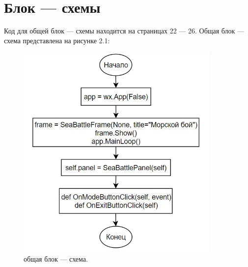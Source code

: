 \section{\label{sec:ch02/sec08}Блок --- схемы}
Код для общей блок --- схемы находится на страницах 22 --- 26. Общая блок --- схема представлена на рисунке 2.1:
\begin{figure}[H]
\graphicspath{ {img/} }
\centering
\includegraphics[width = 10cm]{общая.jpg}
\caption{общая блок --- схема.}
\end{figure}

